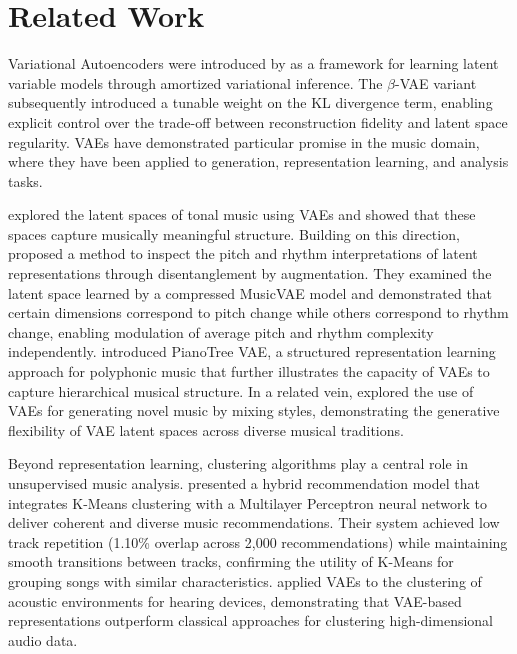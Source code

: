 \documentclass[11pt]{article}
\begin{document}
\section{Related Work}

Variational Autoencoders were introduced by \citet{kingma2014auto} as a framework for learning latent variable models through amortized variational inference. The $\beta$-VAE variant \citep{higgins2017beta} subsequently introduced a tunable weight on the KL divergence term, enabling explicit control over the trade-off between reconstruction fidelity and latent space regularity. VAEs have demonstrated particular promise in the music domain, where they have been applied to generation, representation learning, and analysis tasks.

\citet{carvalho2023exploring} explored the latent spaces of tonal music using VAEs and showed that these spaces capture musically meaningful structure. Building on this direction, \citet{yang2019inspecting} proposed a method to inspect the pitch and rhythm interpretations of latent representations through disentanglement by augmentation. They examined the latent space learned by a compressed MusicVAE model and demonstrated that certain dimensions correspond to pitch change while others correspond to rhythm change, enabling modulation of average pitch and rhythm complexity independently. \citet{wang2020pianotree} introduced PianoTree VAE, a structured representation learning approach for polyphonic music that further illustrates the capacity of VAEs to capture hierarchical musical structure. In a related vein, \citet{somyaji2025melody} explored the use of VAEs for generating novel music by mixing styles, demonstrating the generative flexibility of VAE latent spaces across diverse musical traditions.

Beyond representation learning, clustering algorithms play a central role in unsupervised music analysis. \citet{araujo2025hybrid} presented a hybrid recommendation model that integrates K-Means clustering with a Multilayer Perceptron neural network to deliver coherent and diverse music recommendations. Their system achieved low track repetition (1.10\% overlap across 2,000 recommendations) while maintaining smooth transitions between tracks, confirming the utility of K-Means for grouping songs with similar characteristics. \citet{fiorio2025clustering} applied VAEs to the clustering of acoustic environments for hearing devices, demonstrating that VAE-based representations outperform classical approaches for clustering high-dimensional audio data.
\end{document}
